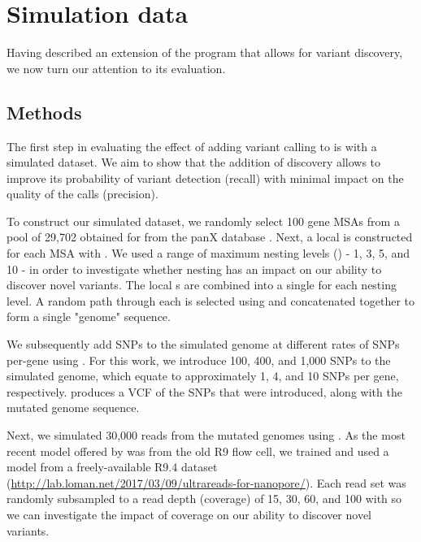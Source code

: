 \section{Simulation data}
\label{sec:denovo-sims}
Having described an extension of the \pandora{} program that allows for \denovo{} variant discovery, we now turn our attention to its evaluation.

\subsection{Methods}
\label{sec:denovo-sims-methods}

The first step in evaluating the effect of adding \denovo{} variant calling to \pandora{} is with a simulated dataset. We aim to show that the addition of \denovo{} discovery allows \pandora{} to improve its probability of variant detection (recall) with minimal impact on the quality of the calls (precision). 

To construct our simulated dataset, we randomly select 100 gene MSAs from a pool of 29,702 obtained for \ecoli{} from the panX database \cite{panx}. Next, a local \prg{} is constructed for each MSA with \makeprg{}. We used a range of maximum nesting levels () - 1, 3, 5, and 10 - in order to investigate whether \prg{} nesting has an impact on our ability to discover novel variants. The local \prg{}s are combined into a single \panrg{} for each nesting level. A random path through each \prg{} is selected using \pandora{} and concatenated together to form a single "genome" sequence. 

We subsequently add SNPs to the simulated genome at different rates of SNPs per-gene using  \cite{snpmutator}. For this work, we introduce 100, 400, and 1,000 SNPs to the simulated genome, which equate to approximately 1, 4, and 10 SNPs per gene, respectively.  produces a VCF of the SNPs that were introduced, along with the mutated genome sequence.

Next, we simulated 30,000 \ont{} reads from the mutated genomes using  \cite{yang2017,brinda2018}. As the most recent model offered by  was from the old R9 \ont{} flow cell, we trained and used a model from a freely-available \ecoli{} R9.4 dataset (\url{http://lab.loman.net/2017/03/09/ultrareads-for-nanopore/}). Each read set was randomly subsampled to a read depth (coverage) of 15, 30, 60, and 100 with  \cite{rasusa2019} so we can investigate the impact of coverage on our ability to discover novel variants.

